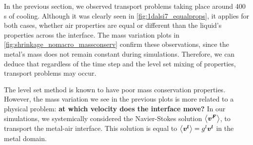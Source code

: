 
In the previous section, we observed transport problems taking place around 400 s of cooling. Although it was clearly seen in \cref{fig:1dalsi7_equalprops}, it applies
for both cases, whether air properties are equal or different than the liquid's properties across the interface. 
The mass variation plots in \cref{fig:shrinkage_nomacro_massconserv} confirm these observations, since the metal's mass does not remain 
constant during simulations.
Therefore, we can deduce that regardless of the time step and the level set mixing of properties, 
transport problems may occur. 

The level set method is known to have poor mass conservation properties. However, the mass variation
we see in the previous plots is more related to a physical problem: \textbf{at which velocity does the interface move?}
In our simulations, we systemically considered the Navier-Stokes solution $\left \langle \boldsymbol{v^F} \right \rangle$,
to transport the metal-air interface. This solution is equal to $\left \langle \boldsymbol{v^l} \right \rangle= {g^l} \boldsymbol{v^l}$ in the metal domain. 

